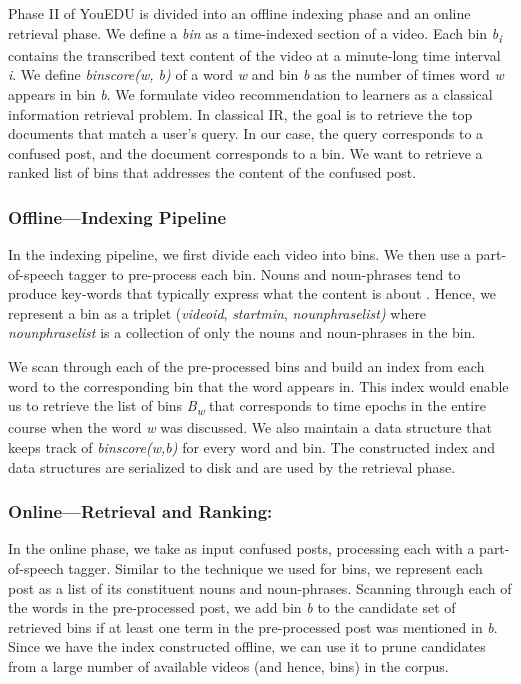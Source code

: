 \documentclass{edm_template}
\begin{document}
Phase II of YouEDU is divided into an offline indexing phase and an online retrieval phase.
We define a \textit {bin} as a time-indexed section of a video. Each bin \textit{b\textsubscript{i}} contains the transcribed text content of the video
at a minute-long time interval \textit{i}. We define \textit{binscore(w, b)} of a word \textit{w} and bin \textit{b} as the number of times word \textit{w} appears in bin \textit{b}. We formulate video recommendation to learners as a classical information retrieval problem. In classical IR, the goal is to retrieve the top documents that match a user's query. In our case, the query corresponds to a confused post, and the document corresponds to a bin. We want to retrieve a ranked list of bins that addresses the content of the confused post.

\subsubsection{Offline---Indexing Pipeline}
In the indexing pipeline, we first divide each video into bins. We then use a part-of-speech tagger \cite{nltk} to pre-process each bin. Nouns and noun-phrases tend to produce key-words that typically express what the content is about \cite{hulth2003improved}. Hence, we represent a bin as a triplet (\textit{video\textunderscore id}, \textit{start\textunderscore min}, \textit{noun\textunderscore phrase\textunderscore list)} where \textit{noun\textunderscore phrase\textunderscore list} is a collection of only the nouns and noun-phrases in the bin.

We scan through each of the pre-processed bins and build an index from each word to the corresponding bin that the word appears in. This index would enable us to retrieve the list of bins \textit{B\textsubscript{w}} that corresponds to time epochs in the entire course when the word \textit{w} was discussed. We also maintain a data structure that keeps track of \textit{binscore(w,b)} for every word and bin. The constructed index and data structures are serialized to disk and are used by the retrieval phase.

\subsubsection{Online---Retrieval and Ranking:}
In the online phase, we take as input confused posts, processing each with a part-of-speech tagger. Similar to the technique we used for bins, we represent each post as a list of its constituent nouns and noun-phrases. Scanning through each of the words in the pre-processed post, we add bin \textit{b} to the candidate set of retrieved bins if at least one term in the pre-processed post was mentioned in \textit{b}. Since we have the index constructed offline, we can use it to prune candidates from a large number of available videos (and hence, bins) in the corpus.
\end{document}
